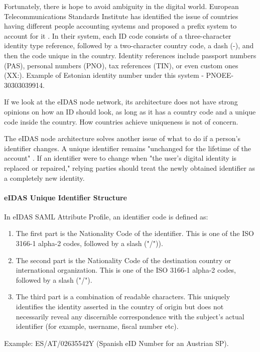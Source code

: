Fortunately, there is hope to avoid ambiguity in the digital world. European Telecommunications Standards Institute has identified the issue of countries having different people accounting systems and proposed a prefix system to account for it \cite{etsi-pno-numbering}. In their system, each ID code consists of a three-character identity type reference, followed by a two-character country code, a dash (-), and then the code unique in the country. Identity references include passport numbers (PAS), personal numbers (PNO), tax references (TIN), or even custom ones ({XX:}). Example of Estonian identity number under this system - {PNOEE-30303039914}.

If we look at the eIDAS node network, its architecture does not have strong opinions on how an ID should look, as long as it has a country code and a unique code inside the country. How countries achieve uniqueness is not of concern.

The eIDAS node architecture solves another issue of what to do if a person's identifier changes. A unique identifier remains "unchanged for the lifetime of the account" \cite{eidas-saml}. If an identifier were to change when "the user's digital identity is replaced or repaired," relying parties should treat the newly obtained identifier as a completely new identity.

\paragraph{eIDAS Unique Identifier Structure} In eIDAS SAML Attribute Profile, an identifier code is defined as:
\begin{enumerate}
  \item The first part is the Nationality Code of the identifier. This is one of the ISO 3166-1 alpha-2 codes, followed by a slash ("/")).
  \item The second part is the Nationality Code of the destination country or international organization. This is one of the ISO 3166-1 alpha-2 codes, followed by a slash ("/").
  \item The third part is a combination of readable characters. This uniquely identifies the identity asserted in the country of origin but does not necessarily reveal any discernible correspondence with the subject's actual identifier (for example, username, fiscal number etc).
\end{enumerate}

Example: ES/AT/02635542Y (Spanish eID Number for an Austrian SP).

